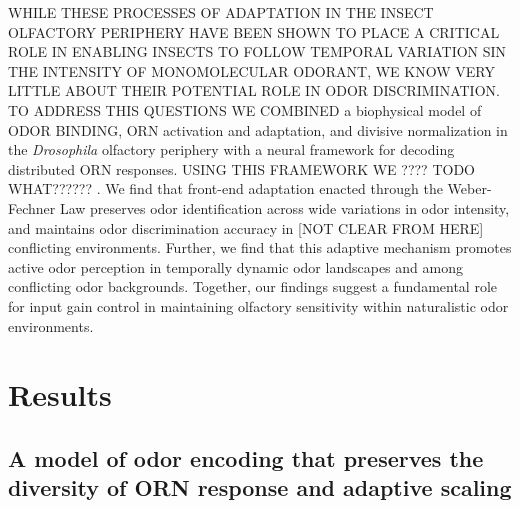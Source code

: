 WHILE THESE PROCESSES OF ADAPTATION IN THE INSECT OLFACTORY PERIPHERY HAVE BEEN SHOWN TO PLACE A CRITICAL ROLE IN ENABLING INSECTS TO FOLLOW TEMPORAL VARIATION SIN THE INTENSITY OF MONOMOLECULAR ODORANT, WE KNOW VERY LITTLE ABOUT THEIR POTENTIAL ROLE IN ODOR DISCRIMINATION. TO ADDRESS THIS QUESTIONS WE COMBINED a biophysical model of ODOR BINDING, ORN activation and adaptation, and divisive normalization in the \textit{Drosophila} olfactory periphery with a neural framework for decoding distributed ORN responses. USING THIS FRAMEWORK WE ????  TODO WHAT?????? . We find that front-end adaptation enacted through the Weber-Fechner Law preserves odor identification across wide variations in odor intensity, and maintains odor discrimination accuracy in [NOT CLEAR FROM HERE] conflicting environments. Further, we find that this adaptive mechanism promotes active odor perception in temporally dynamic odor landscapes and among conflicting odor backgrounds. Together, our findings suggest a fundamental role for input gain control in maintaining olfactory sensitivity within naturalistic odor environments. 






\section{Results}






\subsection{A model of odor encoding that preserves the diversity of ORN response and adaptive scaling}


